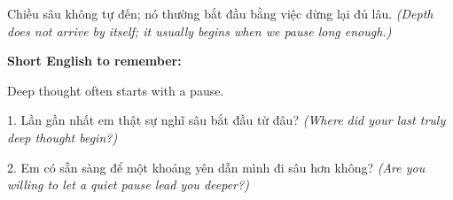 \begin{baihoc}
Chiều sâu không tự đến; nó thường bắt đầu bằng việc dừng lại đủ lâu.
\textit{(Depth does not arrive by itself; it usually begins when we pause long enough.)}
\end{baihoc}

\begin{ghinhoanh}
\textbf{Short English to remember:}

Deep thought often starts with a pause.

\end{ghinhoanh}

\begin{tuhocnhanh}
1. Lần gần nhất em thật sự nghĩ sâu bắt đầu từ đâu? \textit{(Where did your last truly deep thought begin?)}

2. Em có sẵn sàng để một khoảng yên dẫn mình đi sâu hơn không? \textit{(Are you willing to let a quiet pause lead you deeper?)}
\end{tuhocnhanh}
\ngancach

